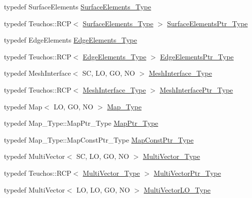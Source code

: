 \begin{DoxyCompactItemize}
\item 
typedef Surface\+Elements \hyperlink{classFEDD_1_1RefinementFactory_ac050bc27156fc5a1e8bf0e01381c33c4}{Surface\+Elements\+\_\+\+Type}
\item 
typedef Teuchos\+::\+R\+CP$<$ \hyperlink{classFEDD_1_1RefinementFactory_ac050bc27156fc5a1e8bf0e01381c33c4}{Surface\+Elements\+\_\+\+Type} $>$ \hyperlink{classFEDD_1_1RefinementFactory_a1067ba23325b19eae16a864f25f7d68f}{Surface\+Elements\+Ptr\+\_\+\+Type}
\item 
typedef Edge\+Elements \hyperlink{classFEDD_1_1RefinementFactory_a11b30196ff403358f3540117f09b6963}{Edge\+Elements\+\_\+\+Type}
\item 
typedef Teuchos\+::\+R\+CP$<$ \hyperlink{classFEDD_1_1RefinementFactory_a11b30196ff403358f3540117f09b6963}{Edge\+Elements\+\_\+\+Type} $>$ \hyperlink{classFEDD_1_1RefinementFactory_ae5285e990ec4632d6188a1280627ad13}{Edge\+Elements\+Ptr\+\_\+\+Type}
\item 
typedef Mesh\+Interface$<$ SC, LO, GO, NO $>$ \hyperlink{classFEDD_1_1RefinementFactory_aff8bb4cd3896a419c36d4baabccbf28a}{Mesh\+Interface\+\_\+\+Type}
\item 
typedef Teuchos\+::\+R\+CP$<$ \hyperlink{classFEDD_1_1RefinementFactory_aff8bb4cd3896a419c36d4baabccbf28a}{Mesh\+Interface\+\_\+\+Type} $>$ \hyperlink{classFEDD_1_1RefinementFactory_a2217802fcbb1342b135d33ea70411089}{Mesh\+Interface\+Ptr\+\_\+\+Type}
\item 
typedef Map$<$ LO, GO, NO $>$ \hyperlink{classFEDD_1_1RefinementFactory_ae3b9a462f8534ab43ce0dbf0d44b3bc5}{Map\+\_\+\+Type}
\item 
typedef Map\+\_\+\+Type\+::\+Map\+Ptr\+\_\+\+Type \hyperlink{classFEDD_1_1RefinementFactory_a554f7a4c5f5014e2ddec03a2e667016c}{Map\+Ptr\+\_\+\+Type}
\item 
typedef Map\+\_\+\+Type\+::\+Map\+Const\+Ptr\+\_\+\+Type \hyperlink{classFEDD_1_1RefinementFactory_a8256ccdf1b2a5c977ddc011f4e8eb8d3}{Map\+Const\+Ptr\+\_\+\+Type}
\item 
typedef Multi\+Vector$<$ SC, LO, GO, NO $>$ \hyperlink{classFEDD_1_1RefinementFactory_af7c4cb285d95e61820d63b9344a90976}{Multi\+Vector\+\_\+\+Type}
\item 
typedef Teuchos\+::\+R\+CP$<$ \hyperlink{classFEDD_1_1RefinementFactory_af7c4cb285d95e61820d63b9344a90976}{Multi\+Vector\+\_\+\+Type} $>$ \hyperlink{classFEDD_1_1RefinementFactory_a0592bb145b1f5b1daac2e69a96c23cb5}{Multi\+Vector\+Ptr\+\_\+\+Type}
\item 
typedef Multi\+Vector$<$ LO, LO, GO, NO $>$ \hyperlink{classFEDD_1_1RefinementFactory_ae731f05f6a28d13f917230f914f29037}{Multi\+Vector\+L\+O\+\_\+\+Type}

\end{DoxyCompactItemize}
